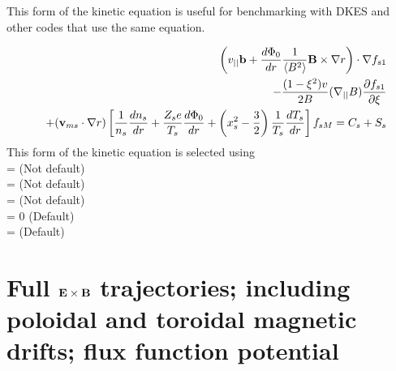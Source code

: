 This form of the kinetic equation is useful for benchmarking with DKES and other codes
that use the same equation.

\begin{eqnarray}
&&\left(v_{||}{\mathbf b} + \frac{d\Phi_0}{dr} \frac{1}{\left< B^2\right>} {\mathbf B}\times\nabla r \right) \cdot \nabla f_{s1} \\
&& - \frac{(1-\xi^2)v}{2B} (\nabla_{||} B)
 \frac{\partial f_{s1}}{\partial \xi} \nonumber \\
&&+ ({\mathbf v}_{ms} \cdot \nabla r) \left[ \frac{1}{n_s} \frac{dn_s}{dr} + \frac{Z_s e}{T_s} \frac{d\Phi_0}{dr} + \left(x_s^2-\frac{3}{2}\right) \frac{1}{T_s} \frac{dT_s}{dr}\right] f_{sM}
 = C_s + S_s \nonumber
\end{eqnarray}
This form of the kinetic equation is selected using \\
 = \false  \;\;\; (Not default) \\
 = \false \;\;\; (Not default) \\
 = \true \;\;\; (Not default) \\
 = 0 \;\;\; (Default) \\
 = \false \;\;\; (Default) %



\section{Full ${\mathbf E}\times{\mathbf B}$ trajectories; including poloidal and toroidal magnetic drifts; flux function potential}

